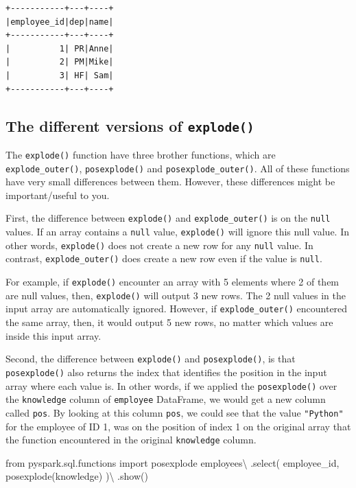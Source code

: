 \documentclass[
  11pt,
  letterpaper,
  DIV=11,
  numbers=noendperiod]{scrreprt}
\newenvironment{Shaded}{\begin{snugshade}}{\end{snugshade}}
\newcommand{\ImportTok}[1]{\textcolor[rgb]{0.00,0.46,0.62}{#1}}
\newcommand{\NormalTok}[1]{\textcolor[rgb]{0.00,0.23,0.31}{#1}}
\newcommand{\OperatorTok}[1]{\textcolor[rgb]{0.37,0.37,0.37}{#1}}
\newcommand{\StringTok}[1]{\textcolor[rgb]{0.13,0.47,0.30}{#1}}
\begin{document}
\begin{verbatim}
+-----------+---+----+
|employee_id|dep|name|
+-----------+---+----+
|          1| PR|Anne|
|          2| PM|Mike|
|          3| HF| Sam|
+-----------+---+----+
\end{verbatim}

\subsection{\texorpdfstring{The different versions of
\texttt{explode()}}{The different versions of explode()}}\label{the-different-versions-of-explode}

The \texttt{explode()} function have three brother functions, which are
\texttt{explode\_outer()}, \texttt{posexplode()} and
\texttt{posexplode\_outer()}. All of these functions have very small
differences between them. However, these differences might be
important/useful to you.

First, the difference between \texttt{explode()} and
\texttt{explode\_outer()} is on the \texttt{null} values. If an array
contains a \texttt{null} value, \texttt{explode()} will ignore this null
value. In other words, \texttt{explode()} does not create a new row for
any \texttt{null} value. In contrast, \texttt{explode\_outer()} does
create a new row even if the value is \texttt{null}.

For example, if \texttt{explode()} encounter an array with 5 elements
where 2 of them are null values, then, \texttt{explode()} will output 3
new rows. The 2 null values in the input array are automatically
ignored. However, if \texttt{explode\_outer()} encountered the same
array, then, it would output 5 new rows, no matter which values are
inside this input array.

Second, the difference between \texttt{explode()} and
\texttt{posexplode()}, is that \texttt{posexplode()} also returns the
index that identifies the position in the input array where each value
is. In other words, if we applied the \texttt{posexplode()} over the
\texttt{knowledge} column of \texttt{employee} DataFrame, we would get a
new column called \texttt{pos}. By looking at this column \texttt{pos},
we could see that the value \texttt{"Python"} for the employee of ID 1,
was on the position of index 1 on the original array that the function
encountered in the original \texttt{knowledge} column.

\begin{Shaded}
\begin{Highlighting}[]
\ImportTok{from}\NormalTok{ pyspark.sql.functions }\ImportTok{import}\NormalTok{ posexplode}
\NormalTok{employees}\OperatorTok{\textbackslash{}}
\NormalTok{    .select(}
        \StringTok{\textquotesingle{}employee\_id\textquotesingle{}}\NormalTok{,}
\NormalTok{        posexplode(}\StringTok{\textquotesingle{}knowledge\textquotesingle{}}\NormalTok{)}
\NormalTok{    )}\OperatorTok{\textbackslash{}}
\NormalTok{    .show()}
\end{Highlighting}
\end{Shaded}
\end{document}

